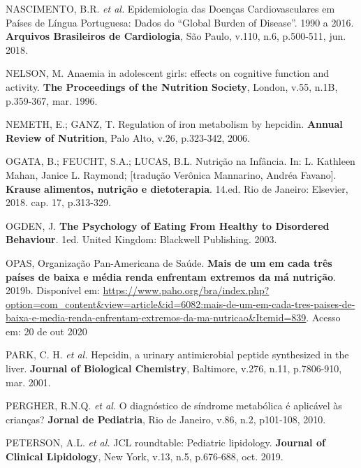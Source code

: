 \bigbreak

\noindent NASCIMENTO, B.R. \textit{et al.} Epidemiologia das Doenças Cardiovasculares em Países de Língua Portuguesa: Dados do “Global Burden of Disease”. 1990 a 2016. \textbf{Arquivos Brasileiros de Cardiologia}, São Paulo, v.110, n.6, p.500-511, jun. 2018.

\bigbreak

\noindent NELSON, M. Anaemia in adolescent girls: effects on cognitive function and activity. \textbf{The Proceedings of the Nutrition Society}, London, v.55, n.1B, p.359-367, mar. 1996.

\bigbreak

\noindent NEMETH, E.; GANZ, T. Regulation of iron metabolism by hepcidin. \textbf{Annual Review of Nutrition}, Palo Alto, v.26, p.323-342, 2006.

\bigbreak

\noindent OGATA, B.; FEUCHT, S.A.; LUCAS, B.L. Nutrição na Infância. In: L. Kathleen Mahan, Janice L. Raymond; [tradução Verônica Mannarino, Andréa Favano]. \textbf{Krause alimentos, nutrição e dietoterapia}. 14.ed. Rio de Janeiro: Elsevier, 2018. cap. 17, p.313-329.

\bigbreak

\noindent OGDEN, J. \textbf{The Psychology of Eating From Healthy to Disordered Behaviour}. 1ed. United Kingdom: Blackwell Publishing. 2003.

\bigbreak

\noindent OPAS, Organização Pan-Americana de Saúde. \textbf{Mais de um em cada três países de baixa e média renda enfrentam extremos da má nutrição}. 2019b. Disponível em: \url{https://www.paho.org/bra/index.php?option=com\_content\&view=article\&id=6082:mais-de-um-em-cada-tres-paises-de-baixa-e-media-renda-enfrentam-extremos-da-ma-nutricao\&Itemid=839}. Acesso em: 20 de out 2020

\bigbreak

\noindent PARK, C. H. \textit{et al.} Hepcidin, a urinary antimicrobial peptide synthesized in the liver. \textbf{Journal of Biological Chemistry}, Baltimore, v.276, n.11, p.7806-910, mar. 2001.

\bigbreak

\noindent PERGHER, R.N.Q. \textit{et al.} O diagnóstico de síndrome metabólica é aplicável às crianças? \textbf{Jornal de Pediatria}, Rio de Janeiro, v.86, n.2, p101-108, 2010.

\bigbreak

\noindent PETERSON, A.L. \textit{et al.} JCL roundtable: Pediatric lipidology. \textbf{Journal of Clinical Lipidology}, New York, v.13, n.5, p.676-688, oct. 2019.
 
